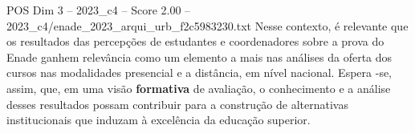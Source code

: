 \begin{textsample}{POS Dim 3 – 2023\_c4 – Score 2.00 – 2023\_c4/enade\_2023\_arqui\_urb\_f2c5983230.txt}
Nesse contexto, é relevante que os resultados das percepções de estudantes e coordenadores sobre a prova do Enade ganhem relevância como um elemento a mais nas análises da oferta dos cursos nas modalidades presencial e a distância, em nível nacional.
Espera -se, assim, que, em uma visão \textbf{formativa} de avaliação, o conhecimento e a análise desses resultados possam contribuir para a construção de alternativas institucionais que induzam à excelência da educação superior.

\end{textsample}
